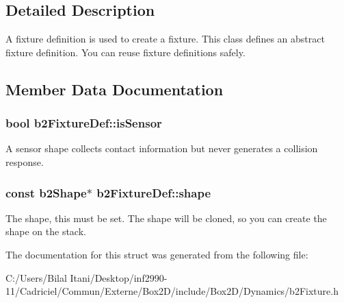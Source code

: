 \subsection{Detailed Description}
A fixture definition is used to create a fixture. This class defines an abstract fixture definition. You can reuse fixture definitions safely. 

\subsection{Member Data Documentation}
\subsubsection[{\texorpdfstring{is\+Sensor}{isSensor}}]{\setlength{\rightskip}{0pt plus 5cm}bool b2\+Fixture\+Def\+::is\+Sensor}\hypertarget{structb2_fixture_def_ac8cfcc6208663c92861eaab3b3fdc57e}{}\label{structb2_fixture_def_ac8cfcc6208663c92861eaab3b3fdc57e}
A sensor shape collects contact information but never generates a collision response. 
\subsubsection[{\texorpdfstring{shape}{shape}}]{\setlength{\rightskip}{0pt plus 5cm}const {\bf b2\+Shape}$\ast$ b2\+Fixture\+Def\+::shape}\hypertarget{structb2_fixture_def_a1e41753d89abf3443e7897e2498a3240}{}\label{structb2_fixture_def_a1e41753d89abf3443e7897e2498a3240}
The shape, this must be set. The shape will be cloned, so you can create the shape on the stack. 

The documentation for this struct was generated from the following file\+:\begin{DoxyCompactItemize}
\item 
C\+:/\+Users/\+Bilal Itani/\+Desktop/inf2990-\/11/\+Cadriciel/\+Commun/\+Externe/\+Box2\+D/include/\+Box2\+D/\+Dynamics/b2\+Fixture.\+h\end{DoxyCompactItemize}
